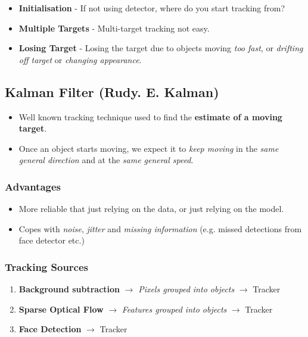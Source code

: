 \documentclass[english, 10pt]{article}
\begin{document}
\begin{itemize}
\item \textbf{Initialisation} - If not using detector, where do you start tracking from?
\item \textbf{Multiple Targets} - Multi-target tracking not easy.
\item \textbf{Losing Target} - Losing the target due to objects moving \textit{too fast}, or \textit{drifting off target} or \textit{changing appearance}.
\end{itemize}

\subsection{Kalman Filter (Rudy. E. Kalman)}

\begin{itemize}
\item Well known tracking technique used to find the \textbf{estimate of a moving target}.
\item Once an object starts moving, we expect it to \textit{keep moving} in the \textit{same general direction} and at the \textit{same general speed}.
\end{itemize}

\subsubsection{Advantages}

\begin{itemize}
\item More reliable that just relying on the data, or just relying on the model.
\item Copes with \textit{noise}, \textit{jitter} and \textit{missing information} (e.g. missed detections from face detector etc.)
\end{itemize}

\subsubsection{Tracking Sources}

\begin{enumerate}
\item \textbf{Background subtraction} $\rightarrow$ \textit{Pixels grouped into objects} $\rightarrow$ Tracker
\item \textbf{Sparse Optical Flow} $\rightarrow$ \textit{Features grouped into objects} $\rightarrow$ Tracker
\item \textbf{Face Detection} $\rightarrow$ Tracker
\end{enumerate}
\end{document}
